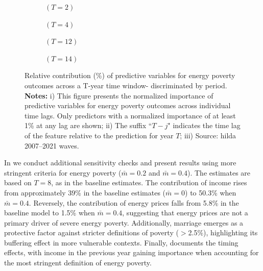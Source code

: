 \documentclass[preprint,authoryear,12pt]{elsarticle}
\begin{document}
\begin{figure}
     \centering
     \begin{subfigure}[b]{0.45\textwidth}
         \centering
         \resizebox{\textwidth}{!}{}
         \caption{$(T=2)$}
     \end{subfigure}
     \hfill
     \begin{subfigure}[b]{0.45\textwidth}
         \centering
         \resizebox{\textwidth}{!}{}
         \caption{$(T=4)$}
     \end{subfigure}
     \hfill
     \begin{subfigure}[b]{0.45\textwidth}
         \centering
         \resizebox{\textwidth}{!}{}
         \caption{$(T=12)$}
     \end{subfigure}
     \hfill
     \begin{subfigure}[b]{0.45\textwidth}
         \centering
         \resizebox{\textwidth}{!}{}
         \caption{$(T=14)$}
     \end{subfigure}
        \caption{Relative contribution (\%) of predictive variables for energy poverty outcomes across a T-year time window- discriminated by period.\\
        {\bf Notes:}  i) This figure presents the normalized importance of predictive variables for energy poverty outcomes across individual time lags. Only predictors with a normalized importance of at least 1\% at any lag are shown; ii) The suffix ``$T-j$" indicates the time lag of the feature relative to the prediction for year $T$; iii) Source: \Gls{hilda} 2007--2021 waves.}
        \label{fig:figure6}
\end{figure}

In  we conduct additional sensitivity checks and present results using more stringent criteria for energy poverty ($\bar{m}=0.2$ and $\bar{m}=0.4$). The estimates are based on $T=8$, as in the baseline estimates. The contribution of income rises from approximately 39\% in the baseline estimates ($\bar{m}=0$) to 50.3\% when $\bar{m}=0.4$. Reversely, the contribution of energy prices falls from 5.8\% in the baseline model to 1.5\% when $\bar{m}=0.4$, suggesting that energy prices are not a primary driver of severe energy poverty. Additionally, marriage emerges as a protective factor against stricter definitions of poverty ($>$2.5\%), highlighting its buffering effect in more vulnerable contexts. Finally,  documents the timing effects, with income in the previous year gaining importance when accounting for the most stringent definition of energy poverty.
\end{document}
